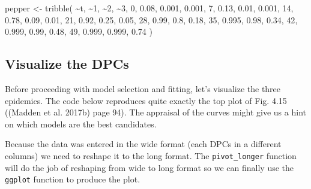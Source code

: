 \documentclass[
  letterpaper,
  DIV=11,
  numbers=noendperiod]{scrreprt}
\newenvironment{Shaded}{\begin{snugshade}}{\end{snugshade}}
\newcommand{\AttributeTok}[1]{\textcolor[rgb]{0.40,0.45,0.13}{#1}}
\newcommand{\DecValTok}[1]{\textcolor[rgb]{0.68,0.00,0.00}{#1}}
\newcommand{\FloatTok}[1]{\textcolor[rgb]{0.68,0.00,0.00}{#1}}
\newcommand{\FunctionTok}[1]{\textcolor[rgb]{0.28,0.35,0.67}{#1}}
\newcommand{\NormalTok}[1]{\textcolor[rgb]{0.00,0.23,0.31}{#1}}
\newcommand{\OtherTok}[1]{\textcolor[rgb]{0.00,0.23,0.31}{#1}}
\newcommand{\SpecialCharTok}[1]{\textcolor[rgb]{0.37,0.37,0.37}{#1}}
\newcommand{\StringTok}[1]{\textcolor[rgb]{0.13,0.47,0.30}{#1}}
\begin{document}
\begin{Shaded}
\begin{Highlighting}[]
\NormalTok{pepper }\OtherTok{\textless{}{-}} 
  \FunctionTok{tribble}\NormalTok{(}
   \SpecialCharTok{\textasciitilde{}}\NormalTok{t,  }\SpecialCharTok{\textasciitilde{}}\StringTok{\textasciigrave{}}\AttributeTok{1}\StringTok{\textasciigrave{}}\NormalTok{,  }\SpecialCharTok{\textasciitilde{}}\StringTok{\textasciigrave{}}\AttributeTok{2}\StringTok{\textasciigrave{}}\NormalTok{,  }\SpecialCharTok{\textasciitilde{}}\StringTok{\textasciigrave{}}\AttributeTok{3}\StringTok{\textasciigrave{}}\NormalTok{,}
   \DecValTok{0}\NormalTok{,  }\FloatTok{0.08}\NormalTok{, }\FloatTok{0.001}\NormalTok{, }\FloatTok{0.001}\NormalTok{,}
   \DecValTok{7}\NormalTok{,  }\FloatTok{0.13}\NormalTok{,  }\FloatTok{0.01}\NormalTok{, }\FloatTok{0.001}\NormalTok{,}
  \DecValTok{14}\NormalTok{,  }\FloatTok{0.78}\NormalTok{,  }\FloatTok{0.09}\NormalTok{,  }\FloatTok{0.01}\NormalTok{,}
  \DecValTok{21}\NormalTok{,  }\FloatTok{0.92}\NormalTok{,  }\FloatTok{0.25}\NormalTok{,  }\FloatTok{0.05}\NormalTok{,}
  \DecValTok{28}\NormalTok{,  }\FloatTok{0.99}\NormalTok{,   }\FloatTok{0.8}\NormalTok{,  }\FloatTok{0.18}\NormalTok{,}
  \DecValTok{35}\NormalTok{, }\FloatTok{0.995}\NormalTok{,  }\FloatTok{0.98}\NormalTok{,  }\FloatTok{0.34}\NormalTok{,}
  \DecValTok{42}\NormalTok{, }\FloatTok{0.999}\NormalTok{,  }\FloatTok{0.99}\NormalTok{,  }\FloatTok{0.48}\NormalTok{,}
  \DecValTok{49}\NormalTok{, }\FloatTok{0.999}\NormalTok{, }\FloatTok{0.999}\NormalTok{,  }\FloatTok{0.74}
\NormalTok{  ) }
\end{Highlighting}
\end{Shaded}

\hypertarget{visualize-the-dpcs}{%
\subsection{Visualize the DPCs}\label{visualize-the-dpcs}}

Before proceeding with model selection and fitting, let's visualize the
three epidemics. The code below reproduces quite exactly the top plot of
Fig. 4.15 ((Madden et al. 2017b) page 94). The appraisal of the curves
might give us a hint on which models are the best candidates.

Because the data was entered in the wide format (each DPCs in a
different columns) we need to reshape it to the long format. The
\texttt{pivot\_longer} function will do the job of reshaping from wide
to long format so we can finally use the \texttt{ggplot} function to
produce the plot.
\end{document}
